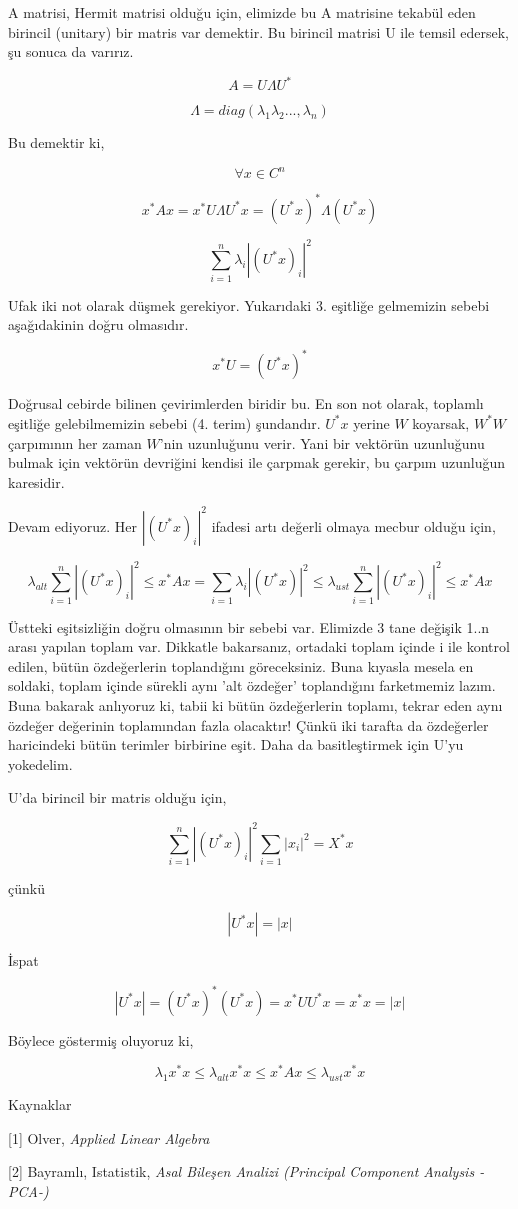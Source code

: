 \documentclass[12pt,fleqn]{article}\usepackage{../../common}
\begin{document}
A matrisi, Hermit matrisi olduğu için, elimizde bu A matrisine tekabül eden
birincil (unitary) bir matris var demektir. Bu birincil matrisi U ile
temsil edersek, şu sonuca da varırız.

$$ A = U \Lambda U^\ast $$

$$ \Lambda = diag(\lambda_1\lambda_2...,\lambda_n) $$

Bu demektir ki, 

$$ \forall x \in  C^n $$

$$ x^\ast A x = x^\ast U \Lambda U^\ast x = (U^\ast x)^\ast \Lambda(U^\ast x) $$

$$
\sum_{i=1}^n \lambda_i |(U^\ast x)_i|^2
$$

Ufak iki not olarak düşmek gerekiyor. Yukarıdaki 3. eşitliğe gelmemizin
sebebi aşağıdakinin doğru olmasıdır.

$$
x^\ast U = (U^\ast x)^\ast
$$

Doğrusal cebirde bilinen çevirimlerden biridir bu. En son not olarak, toplamlı
eşitliğe gelebilmemizin sebebi (4. terim) şundandır. $U^\ast x$ yerine $W$
koyarsak, $W^\ast W$ çarpımının her zaman $W$'nin uzunluğunu verir. Yani bir
vektörün uzunluğunu bulmak için vektörün devriğini kendisi ile çarpmak gerekir,
bu çarpım uzunluğun karesidir.

Devam ediyoruz. Her $|(U^\ast x)_i|^2$ ifadesi artı değerli olmaya mecbur
olduğu için,

$$
\lambda_{alt} \sum_{i=1}^n | (U^\ast x)_i |^2 \le
x^\ast Ax = 
\sum_{i=1} \lambda_i | (U^\ast x) |^2 \le
\lambda_{ust} \sum_{i=1}^n | (U^\ast x)_i|^2 \le
x^\ast Ax 
$$

Üstteki eşitsizliğin doğru olmasının bir sebebi var. Elimizde 3 tane
değişik 1..n arası yapılan toplam var. Dikkatle bakarsanız, ortadaki
toplam içinde i ile kontrol edilen, bütün özdeğerlerin toplandığını
göreceksiniz. Buna kıyasla mesela en soldaki, toplam içinde sürekli aynı
'alt özdeğer' toplandığını farketmemiz lazım. Buna bakarak anlıyoruz ki,
tabii ki bütün özdeğerlerin toplamı, tekrar eden aynı özdeğer değerinin
toplamından fazla olacaktır! Çünkü iki tarafta da özdeğerler haricindeki
bütün terimler birbirine eşit. Daha da basitleştirmek için U'yu yokedelim.

U'da birincil bir matris olduğu için, 

$$
\sum_{i=1}^n |(U^\ast x)_i|^2 \sum_{i=1} |x_i|^2 = X^\ast x
$$

çünkü

$$
|U^\ast x| = |x|
$$

İspat

$$
|U^\ast x| = (U^\ast x)^\ast(U^\ast x) = x^\ast UU^\ast x = x^\ast x = | x |
$$

Böylece göstermiş oluyoruz ki, 

$$
\lambda_1 x^\ast x \le \lambda_{alt} x^\ast x \le x^\ast Ax \le \lambda_{ust}
x^\ast x
$$ 

Kaynaklar

[1] Olver, {\em Applied Linear Algebra}

[2] Bayramlı, Istatistik, {\em Asal Bileşen Analizi (Principal Component Analysis -PCA-)}
\end{document}
